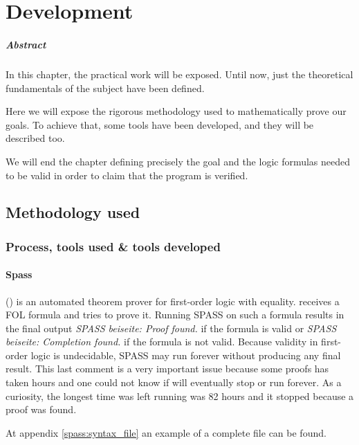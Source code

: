\chapter{Development\label{sec:develpment}}

\paragraph{Abstract} 


In this chapter, the practical work will be exposed. 
%
Until now, just the theoretical fundamentals of the subject have been defined.

Here we will expose the rigorous methodology used to mathematically prove our goals.
%
To achieve that, some tools have been developed, and they will be described too.

We will end the chapter defining precisely the goal and the logic formulas needed to be valid in order to claim that the program is verified.

\section{Methodology used}

\subsection{Process, tools used \& tools developed}

\subsubsection{Spass}

\spass () is an automated theorem prover for first-order logic with equality. 
%
\spass receives a \gls{FOL} formula and tries to prove it.
% 
Running SPASS on such a formula results in the final output \textit{SPASS beiseite: Proof found.} if the formula is valid or  \textit{SPASS beiseite: Completion found.} if the formula is not valid.
Because validity in first-order logic is undecidable, SPASS may run forever without producing any final result.
%
This last comment is a very important issue because some proofs has taken hours and one could not know if \spass will eventually stop or run forever.
%
As a curiosity, the longest time \spass was left running was 82 hours and it stopped because a proof was found.

At appendix \ref{spass:syntax_file} an example of a complete \spass file can be found.


